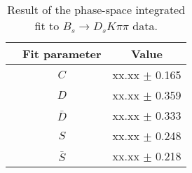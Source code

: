 \begin{table}[h]
\centering
\caption{Result of the phase-space integrated fit to $B_s \to D_s K \pi \pi$ data.}
\begin{tabular}{c c c}
\hline
\hline
& Fit parameter & Value \\
\hline
& $C$ &  xx.xx  $\pm$ 0.165\\
&$D$ &  xx.xx  $\pm$ 0.359\\
&$\bar D$ &  xx.xx  $\pm$ 0.333\\
& $S$ &  xx.xx  $\pm$ 0.248\\
& $\bar S$ &  xx.xx  $\pm$ 0.218\\
\hline
\hline
\end{tabular}
\label{table:timeFit_signal}
\end{table}